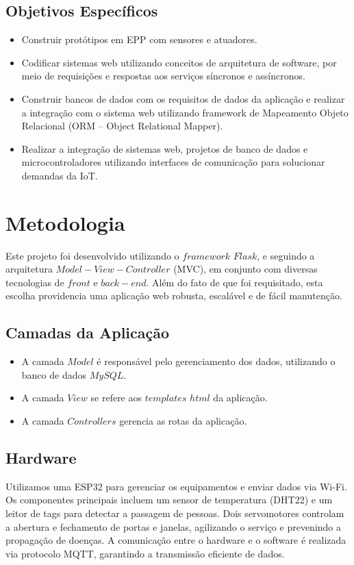 \documentclass[conference, a4paper, 12pt]{IEEEtran}
\begin{document}
  \subsection{Objetivos Específicos}
\begin{itemize}
  \item Construir protótipos em
EPP com sensores e atuadores. 
\item Codificar sistemas web
utilizando conceitos de
arquitetura de software, por meio
de requisições e respostas aos
serviços síncronos e assíncronos. 
\item Construir bancos de dados
com os requisitos de dados da
aplicação e realizar a integração
com o sistema web utilizando
framework de Mapeamento
Objeto Relacional (ORM – Object
Relational Mapper).
\item Realizar a integração de
sistemas web, projetos de banco
de dados e microcontroladores
utilizando interfaces de
comunicação para solucionar
demandas da IoT.
\end{itemize}

\section{Metodologia}
\label{sec:metodologia}
Este projeto foi desenvolvido utilizando o $framework$ $Flask$, e seguindo a arquitetura $Model-View-Controller$ (MVC), em conjunto com diversas tecnologias de $front$ e $back-end$. Além do fato de que foi requisitado, esta escolha providencia uma aplicação web robusta, escalável e de fácil manutenção.

\subsection{Camadas da Aplicação}
\begin{itemize}
  \item A camada $Model$ é responsável pelo gerenciamento dos dados, utilizando o banco de dados $MySQL$. 

  \item A camada $View$ se refere aos $templates$ $html$ da aplicação.

  \item A camada $Controllers$ gerencia as rotas da aplicação.
\end{itemize}

\subsection{Hardware}
Utilizamos uma ESP32 para gerenciar os equipamentos e enviar dados via Wi-Fi. Os componentes principais incluem um sensor de temperatura (DHT22) e um leitor de tags para detectar a passagem de pessoas. Dois servomotores controlam a abertura e fechamento de portas e janelas, agilizando o serviço e prevenindo a propagação de doenças. A comunicação entre o hardware e o software é realizada via protocolo MQTT, garantindo a transmissão eficiente de dados.
\end{document}
